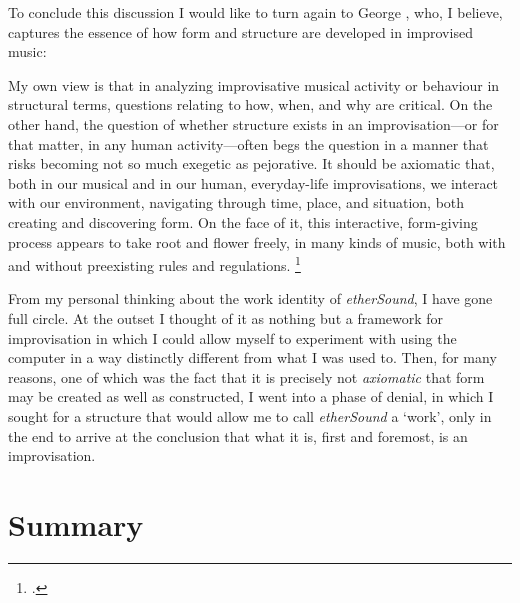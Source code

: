 To conclude this discussion I would like to turn again to George \citeauthor{lewis-1}, who, I believe, captures the essence of how form and structure are developed in improvised music: 
\begin{squote} 
My own view is that in analyzing improvisative musical activity or behaviour in structural terms, questions relating to how, when, and why are critical. On the other hand, the question of whether structure exists in an improvisation---or for that matter, in any human activity---often begs the question in a manner that risks becoming not so much exegetic as pejorative. It should be axiomatic that, both in our musical and in our human, everyday-life improvisations, we interact with our environment, navigating through time, place, and situation, both creating and discovering form. On the face of it, this interactive, form-giving process appears to take root and flower freely, in many kinds of music, both with and without preexisting rules and regulations. \footcite[117]{lewis-1} 
\end{squote} 
From my personal thinking about the work identity of \emph{etherSound}, I have gone full circle. At the outset I thought of it as nothing but a framework for improvisation in which I could allow myself to experiment with using the computer in a way distinctly different from what I was used to. Then, for many reasons, one of which was the fact that it is precisely not \emph{axiomatic} that form may be created as well as constructed, I went into a phase of denial, in which I sought for a structure that would allow me to call \emph{etherSound} a `work', only in the end to arrive at the conclusion that what it is, first and foremost, is an improvisation. 


\section{Summary}
\label{sec:endnote}

